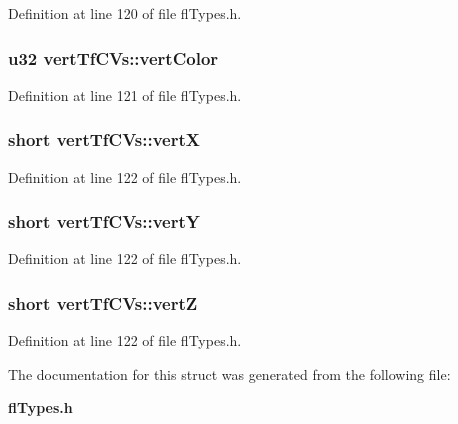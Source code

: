 Definition at line 120 of file fl\-Types.h.
\subsubsection{\setlength{\rightskip}{0pt plus 5cm}u32 {\bf vert\-Tf\-CVs::vert\-Color}}\label{structvertTfCVs_fb14fd3838aa879656e7666d79aeb81f}




Definition at line 121 of file fl\-Types.h.
\subsubsection{\setlength{\rightskip}{0pt plus 5cm}short {\bf vert\-Tf\-CVs::vert\-X}}\label{structvertTfCVs_752842575dbfeedd92721c9b5a923a33}




Definition at line 122 of file fl\-Types.h.
\subsubsection{\setlength{\rightskip}{0pt plus 5cm}short {\bf vert\-Tf\-CVs::vert\-Y}}\label{structvertTfCVs_43c132893888eacc9d072ce4ea0dcb19}




Definition at line 122 of file fl\-Types.h.
\subsubsection{\setlength{\rightskip}{0pt plus 5cm}short {\bf vert\-Tf\-CVs::vert\-Z}}\label{structvertTfCVs_29d7ad8e26c581864f6ad8a76801c5eb}




Definition at line 122 of file fl\-Types.h.

The documentation for this struct was generated from the following file:\begin{CompactItemize}
\item 
{\bf fl\-Types.h}\end{CompactItemize}
